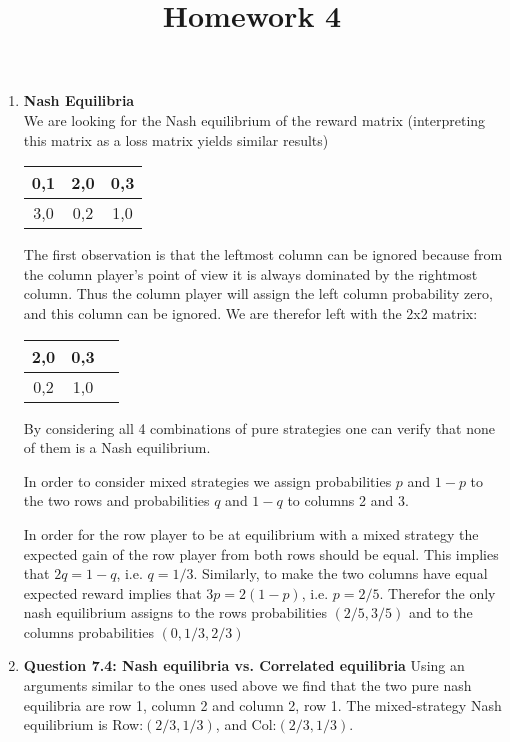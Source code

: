 \documentclass[12pt]{article}
\title{Homework 4}
\begin{document}
\maketitle
\begin{enumerate}
\item {\bf Nash Equilibria} \\

We are looking for the Nash equilibrium of the reward matrix
(interpreting this matrix as a loss matrix yields similar results)
\begin{center} 
\begin{tabular}{ |c|c|c|} 
\hline 0,1 & 2,0 & 0,3 \\ 
\hline 3,0 & 0,2 & 1,0 \\
\hline
\end{tabular} 
\end{center}

The first observation is that the leftmost column can be ignored
because from the column player's point of view it is always dominated
by the rightmost column. Thus the column player will assign the left
column probability zero, and this column can be ignored.
We are therefor left with the 2x2 matrix:
\begin{center} 
\begin{tabular}{ |c|c|c|} 
\hline 2,0 & 0,3 \\ 
\hline 0,2 & 1,0 \\
\hline
\end{tabular} 
\end{center}
By considering all 4 combinations of pure strategies one can verify
that none of them is a Nash equilibrium.

In order to consider mixed strategies we assign probabilities $p$ and
$1-p$ to the two rows and probabilities $q$ and $1-q$ to columns 2 and
3.

In order for the row player to be at equilibrium with a mixed strategy
the expected gain of the row player from both rows should be
equal. This implies that $2q=1-q$, i.e. $q=1/3$. Similarly, to make
the two columns have equal expected reward implies that $3p=2(1-p)$,
i.e. $p=2/5$. Therefor the only nash equilibrium assigns to the rows
probabilities $(2/5,3/5)$ and to the columns probabilities
$(0,1/3,2/3)$

\item {\bf Question 7.4: Nash equilibria vs. Correlated equilibria}
Using an arguments similar to the ones used above we find that the two
pure nash equilibria are row 1, column 2 and column 2, row 1. The
mixed-strategy Nash equilibrium is Row:$(2/3,1/3)$, and Col:$(2/3,1/3)$.


\end{enumerate}
\end{document}
